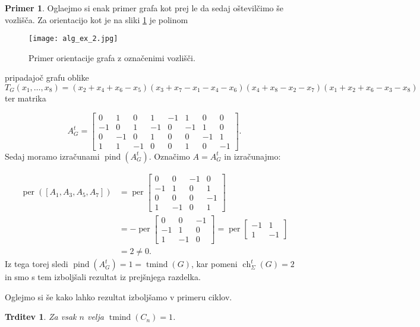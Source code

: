 \documentclass[12pt,a4paper,twoside]{article}
\theoremstyle{definition} %
\newtheorem{primer}[definicija]{Primer}
\theoremstyle{plain} %
\newtheorem{trditev}[definicija]{Trditev}
\newcommand{\eclt}{\ch_{\Sigma}^t}
\numberwithin{equation}{section}  %
\DeclareMathOperator{\per}{per}
\DeclareMathOperator{\tmind}{tmind}
\DeclareMathOperator{\pind}{pind}
\DeclareMathOperator{\ch}{ch}
\begin{document}
\begin{primer}
Oglaejmo si enak primer grafa kot prej le da sedaj oštevilčimo še vozlišča. Za orientacijo kot je na sliki \ref{ex_2} je polinom
 \begin{figure}[h!]
\caption{Primer orientacije grafa z označenimi vozlišči.}
\label{ex_2}
\centering
    \texttt{[image: alg\_ex\_2.jpg]}
    \end{figure}
pripadajoč grafu oblike $T_G(x_1, \ldots, x_8) = (x_2 + x_4 + x_6 - x_5)(x_3 + x_7 - x_1 - x_4 - x_6)(x_4 + x_8 - x_2 - x_7)(x_1 + x_2 + x_6 - x_3 - x_8)$ ter matrika 

$$A_G^t = \left[ \begin{matrix} 0 & 1 & 0 & 1 & -1 & 1 & 0 & 0 \\ -1 & 0 & 1 & -1 & 0 & -1 & 1 & 0 \\ 0 & -1 & 0 & 1 & 0 & 0 & -1 & 1 \\ 1 & 1 & -1 & 0 & 0 & 1 & 0 & -1 \end{matrix} \right].$$
Sedaj moramo izračunami $\pind(A_G^t)$. Označimo $A =A_G^t$ in izračunajmo:

\begin{equation*}
\begin{split}
 \per([A_1, A_3, A_5, A_7]) &= \per\left[ \begin{matrix} 0 & 0 & -1 & 0 \\ -1 & 1 & 0 & 1 \\ 0 & 0 & 0 & -1 \\ 1 & -1 & 0 & 1 \end{matrix} \right] \\
&= -\per\left[ \begin{matrix} 0 & 0 & -1 \\ -1 & 1 & 0 \\ 1 & -1 & 0 \end{matrix} \right] =\per\left[ \begin{matrix} -1 & 1 \\ 1 & -1 \end{matrix} \right] \\
&=2 \neq 0.
\end{split}
\end{equation*}
Iz tega torej sledi $\pind(A_G^t) = 1 =\tmind(G)$, kar pomeni $\eclt(G) = 2$ in smo s tem izboljšali rezultat iz prejšnjega razdelka.
\end{primer}

Oglejmo si še kako lahko rezultat izboljšamo v primeru ciklov.
\begin{trditev}
Za vsak $n$ velja $\tmind(C_n) = 1$.
\end{trditev}
\end{document}
